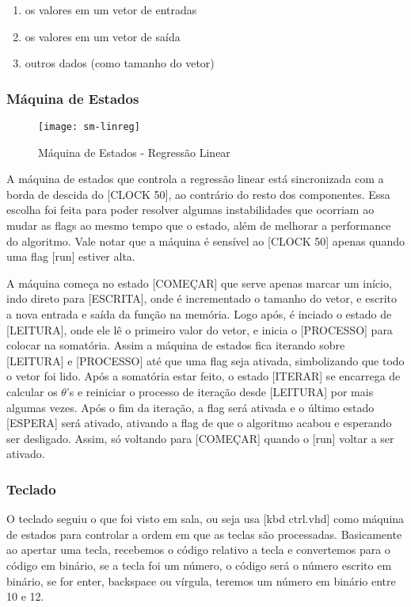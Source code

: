 \begin{enumerate}
    \item os valores em um vetor de entradas
    \item os valores em um vetor de saída
    \item outros dados (como tamanho do vetor)
\end{enumerate}

\subsubsection{Máquina de Estados}

    \begin{figure} [H] 
        \texttt{[image: sm-linreg]}
        \caption{Máquina de Estados - Regressão Linear}
        \label{fig:sm-linreg}
    \end{figure}

A máquina de estados que controla a regressão linear está sincronizada com a borda de descida do [CLOCK 50], ao contrário do resto dos componentes.
Essa escolha foi feita para poder resolver algumas instabilidades que ocorriam ao mudar as flags ao mesmo tempo que o estado, além de melhorar
a performance do algoritmo. Vale notar que a máquina é sensível ao [CLOCK 50] apenas quando uma flag [run] estiver alta.


A máquina começa no estado [COMEÇAR] que serve apenas marcar um início, indo direto para [ESCRITA], onde é incrementado o tamanho do vetor, e escrito
a nova entrada e saída da função na memória. Logo após, é inciado o estado de [LEITURA], onde ele lê o primeiro valor do vetor, e inicia o [PROCESSO]
para colocar na somatória. Assim a máquina de estados fica iterando sobre [LEITURA] e [PROCESSO] até que uma flag seja ativada, simbolizando que
todo o vetor foi lido. Após a somatória estar feito, o estado [ITERAR] se encarrega de calcular os $\theta$'s e reiniciar o processo de iteração
desde [LEITURA] por mais algumas vezes. Após o fim da iteração, a flag será ativada e o último estado [ESPERA] será ativado, ativando a flag de que
o algoritmo acabou e esperando ser desligado. Assim, só voltando para [COMEÇAR] quando o [run] voltar a ser ativado.

\subsubsection{Teclado}

O teclado seguiu o que foi visto em sala, ou seja usa [kbd ctrl.vhd] como máquina de estados para controlar a ordem em que as teclas são processadas. 
Basicamente ao apertar uma tecla, recebemos o código relativo a tecla e convertemos para o código em binário, se a tecla foi um número, 
o código será o número escrito em binário, se for enter, backspace ou vírgula, teremos um número em binário entre 10 e 12.

